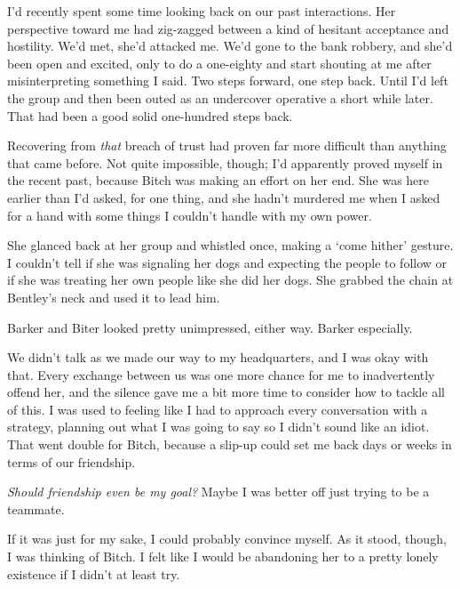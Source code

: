 I'd recently spent some time looking back on our past interactions.  Her perspective toward me had zig-zagged between a kind of hesitant acceptance and hostility.  We'd met, she'd attacked me.  We'd gone to the bank robbery, and she'd been open and excited, only to do a one-eighty and start shouting at me after misinterpreting something I said.  Two steps forward, one step back.  Until I'd left the group and then been outed as an undercover operative a short while later.  That had been a good solid one-hundred steps back.



Recovering from \emph{that} breach of trust had proven far more difficult than anything that came before.  Not quite impossible, though; I'd apparently proved myself in the recent past, because Bitch was making an effort on her end.  She was here earlier than I'd asked, for one thing, and she hadn't murdered me when I asked for a hand with some things I couldn't handle with my own power.



She glanced back at her group and whistled once, making a `come hither' gesture.  I couldn't tell if she was signaling her dogs and expecting the people to follow or if she was treating her own people like she did her dogs.  She grabbed the chain at Bentley's neck and used it to lead him.



Barker and Biter looked pretty unimpressed, either way.  Barker especially.



We didn't talk as we made our way to my headquarters, and I was okay with that.  Every exchange between us was one more chance for me to inadvertently offend her, and the silence gave me a bit more time to consider how to tackle all of this.  I was used to feeling like I had to approach every conversation with a strategy, planning out what I was going to say so I didn't sound like an idiot.  That went double for Bitch, because a slip-up could set me back days or weeks in terms of our friendship.



\emph{Should friendship even be my goal?}  Maybe I was better off just trying to be a teammate.



If it was just for my sake, I could probably convince myself.  As it stood, though, I was thinking of Bitch.  I felt like I would be abandoning her to a pretty lonely existence if I didn't at least try.



